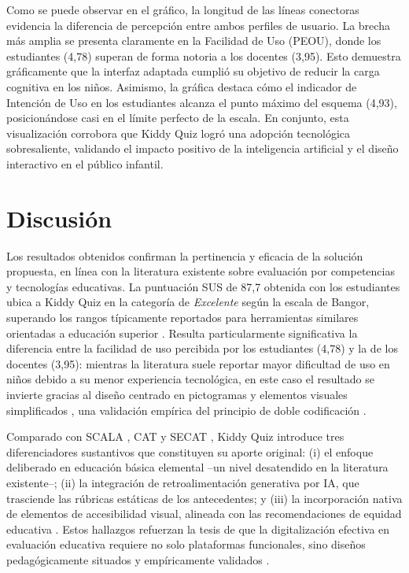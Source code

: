 Como se puede observar en el gráfico, la longitud de las líneas conectoras evidencia la diferencia de percepción entre ambos perfiles de usuario. La brecha más amplia se presenta claramente en la Facilidad de Uso (PEOU), donde los estudiantes (4,78) superan de forma notoria a los docentes (3,95). Esto demuestra gráficamente que la interfaz adaptada cumplió su objetivo de reducir la carga cognitiva en los niños. Asimismo, la gráfica destaca cómo el indicador de Intención de Uso en los estudiantes alcanza el punto máximo del esquema (4,93), posicionándose casi en el límite perfecto de la escala. En conjunto, esta visualización corrobora que Kiddy Quiz logró una adopción tecnológica sobresaliente, validando el impacto positivo de la inteligencia artificial y el diseño interactivo en el público infantil.

\section{Discusión}

Los resultados obtenidos confirman la pertinencia y eficacia de la solución propuesta, en línea con la literatura existente sobre evaluación por competencias y tecnologías educativas. La puntuación SUS de 87,7 obtenida con los estudiantes ubica a Kiddy Quiz en la categoría de \textit{Excelente} según la escala de Bangor, superando los rangos típicamente reportados para herramientas similares orientadas a educación superior \cite{ref10_cat,ref21_scala_universidad}. Resulta particularmente significativa la diferencia entre la facilidad de uso percibida por los estudiantes (4,78) y la de los docentes (3,95): mientras la literatura suele reportar mayor dificultad de uso en niños debido a su menor experiencia tecnológica, en este caso el resultado se invierte gracias al diseño centrado en pictogramas y elementos visuales simplificados \cite{ref40_mayer,ref48_nielsen}, una validación empírica del principio de doble codificación \cite{ref43_paivio}.

Comparado con SCALA \cite{ref21_scala_universidad}, CAT \cite{ref10_cat} y SECAT \cite{ref11_secat}, Kiddy Quiz introduce tres diferenciadores sustantivos que constituyen su aporte original: (i) el enfoque deliberado en educación básica elemental --un nivel desatendido en la literatura existente--; (ii) la integración de retroalimentación generativa por IA, que trasciende las rúbricas estáticas de los antecedentes; y (iii) la incorporación nativa de elementos de accesibilidad visual, alineada con las recomendaciones de equidad educativa \cite{ref42_cabero}. Estos hallazgos refuerzan la tesis de que la digitalización efectiva en evaluación educativa requiere no solo plataformas funcionales, sino diseños pedagógicamente situados y empíricamente validados \cite{ref14_anderson,ref27_blackwiliam}.

